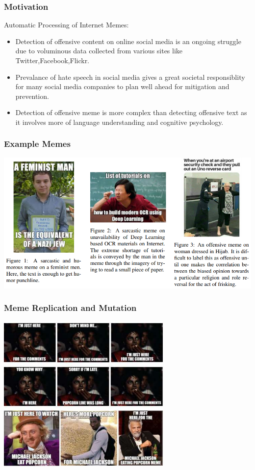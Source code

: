 \documentclass[]{beamer}
\begin{document}
\begin{frame}\frametitle{Motivation}
  Automatic Processing of Internet Memes:
\begin{itemize}
\item  Detection of offensive content on online social media is an ongoing struggle due to voluminous data collected from various sites like Twitter,Facebook,Flickr.
\item  Prevalance of hate speech in social media gives a great societal responsiblity for many social media companies to plan well ahead for mitigation and prevention.
\item Detection of offensive meme is more complex than detecting offensive text as it involves more of language understanding and cognitive psychology.		
\end{itemize}
\end{frame}
\begin{frame}\frametitle{Example Memes}
\begin{center}
	\includegraphics[scale=0.37]{exampleImg/memotion_example.png}
\end{center}
\end{frame}
\begin{frame}\frametitle{Meme Replication and Mutation}
\begin{center}
	
\includegraphics[scale=0.75]{exampleImg/memeRepAndMutation.png}
\end{center}
\end{frame}
\end{document}
